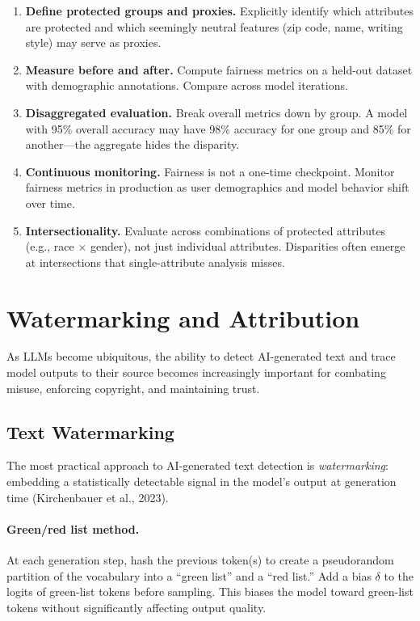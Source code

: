 \begin{enumerate}[label=\textbf{\arabic*.}]
    \item \textbf{Define protected groups and proxies.}  Explicitly identify
    which attributes are protected and which seemingly neutral features (zip
    code, name, writing style) may serve as proxies.
    \item \textbf{Measure before and after.}  Compute fairness metrics on a
    held-out dataset with demographic annotations.  Compare across model
    iterations.
    \item \textbf{Disaggregated evaluation.}  Break overall metrics down by
    group.  A model with 95\% overall accuracy may have 98\% accuracy for one
    group and 85\% for another---the aggregate hides the disparity.
    \item \textbf{Continuous monitoring.}  Fairness is not a one-time
    checkpoint.  Monitor fairness metrics in production as user demographics
    and model behavior shift over time.
    \item \textbf{Intersectionality.}  Evaluate across combinations of
    protected attributes (e.g., race $\times$ gender), not just individual
    attributes.  Disparities often emerge at intersections that single-attribute
    analysis misses.
\end{enumerate}

\section{Watermarking and Attribution}
\label{sec:watermarking}

As LLMs become ubiquitous, the ability to detect AI-generated text and trace
model outputs to their source becomes increasingly important for combating
misuse, enforcing copyright, and maintaining trust.

\subsection{Text Watermarking}

The most practical approach to AI-generated text detection is \emph{watermarking}:
embedding a statistically detectable signal in the model's output at generation
time (Kirchenbauer et al., 2023).

\paragraph{Green/red list method.}
At each generation step, hash the previous token(s) to create a pseudorandom
partition of the vocabulary into a ``green list'' and a ``red list.''  Add a
bias $\delta$ to the logits of green-list tokens before sampling.  This biases
the model toward green-list tokens without significantly affecting output
quality.

